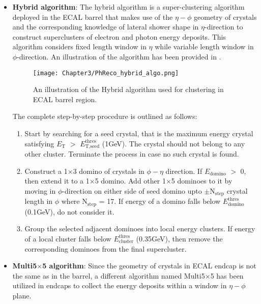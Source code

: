 \begin{itemize}[leftmargin=*]
\item {\bf{Hybrid algorithm}}: The hybrid algorithm is a super-clustering algorithm deployed in the ECAL barrel that makes use of the $\eta-\phi$ geometry of crystals
  and the corresponding knowledge of lateral shower shape in $\eta$-direction to construct superclusters of electron and photon energy deposits.  This algorithm
  considers fixed length window in $\eta$ while variable length window in $\phi$-direction. An illustration of the algorithm has been provided in \fig{\ref{fig:Hybrid}}.
  
  \begin{figure}[h]
  \begin{center}
  \texttt{[image: Chapter3/PhReco\_hybrid\_algo.png]}
  \caption{An illustration of the Hybrid algorithm used for clustering in ECAL barrel region.}
  \label{fig:Hybrid}
  \end{center}
  \end{figure}
  \vspace{-0.2in}
The complete step-by-step procedure is outlined as follows:
  \begin{enumerate}
  \item Start by searching for a seed crystal, that is the maximum energy crystal satisfying $E_{\textrm{T}}$ $>$ $E_{\textrm{T,seed}}^{\textrm{thres}}$
    (1\unit{GeV}). The crystal should not belong to any other cluster. Terminate the process in case no such crystal is found.
  \item Construct a 1$\times$3 domino of crystals in $\phi-\eta$ direction. If $E_{\textrm{domino}}$ $>$ 0, then extend it to a 1$\times$5 domino. Add other 1$\times$5
    dominoes to it by moving in $\phi$-direction on either side of seed domino upto $\pm$N$_{\textrm{step}}$ crystal length in $\phi$ where N$_{\textrm{step}}$ = 17.
    If energy of a domino falls below $E_{\textrm{domino}}^{\textrm{thres}}$ (0.1\unit{GeV}), do not consider it.
  \item Group the selected adjacent dominoes into local energy clusters. If energy of a local cluster falls below $E_{\textrm{cluster}}^{\textrm{thres}}$ (0.35\unit{GeV}),
    then remove the corresponding dominoes from the final supercluster. 
  \end{enumerate}
\item {\bf{Multi5$\times$5 algorithm}}: Since the geometry of crystals in ECAL endcap is not the same as in the barrel, a different algorithm named Multi5$\times$5
  has been utilized in endcaps to collect the energy deposits within a window in $\eta-\phi$ plane.

\end{itemize}
